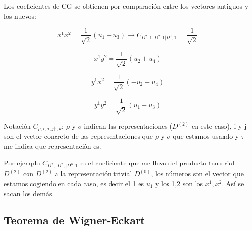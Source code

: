 \documentclass{article}
\begin{document}
        Los coeficientes de CG se obtienen por comparación entre los vectores antiguos y los nuevos:

        $$x^1x^2=\frac{1}{\sqrt{2}}(u_1+u_3) \to C_{D^2,1,D^2,1| D^0, 1}=\frac{1}{\sqrt{2}}$$

         $$x^1y^2=\frac{1}{\sqrt{2}}(u_2+u_4)$$

         $$y^1x^2=\frac{1}{\sqrt{2}}(-u_2+u_4)$$

          $$y^1y^2=\frac{1}{\sqrt{2}}(u_1-u_3)$$

           Notación $C_{\rho, i, \sigma ,j | \tau , k}$; $\rho$ y $\sigma$ indican las representaciones ($D^{(2)}$ en este caso), i y j son el vector concreto de las representaciones que $\rho$ y $\sigma$ que estamos usando y $\tau$ me indica que representación es.

           Por ejemplo $C_{D^2,,D^2, |D^0 ,1}$ es el coeficiente que me lleva del producto tensorial $D^{(2)}$ con $D^{(2)}$ a la representación trivial $D^{(0)}$, los números son el vector que estamos cogiendo en cada caso, es decir el 1 es $u_1$ y los 1,2 son los $x^1,x^2$. Así se sacan los demás.



      \subsection{Teorema de Wigner-Eckart}
\end{document}
